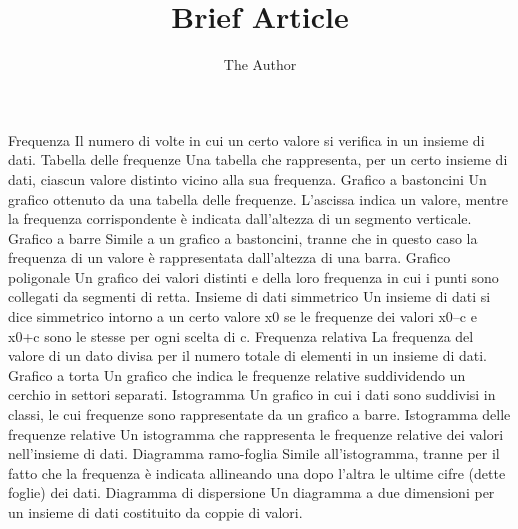\documentclass[11pt, oneside]{article}   	%
\title{Brief Article}
\author{The Author}
\begin{document}
\maketitle

Frequenza Il numero di volte in cui un certo valore si verifica in un insieme di dati.
Tabella delle frequenze Una tabella che rappresenta, per un certo insieme di dati,
ciascun valore distinto vicino alla sua frequenza.
Grafico a bastoncini Un grafico ottenuto da una tabella delle frequenze. L’ascissa
indica un valore, mentre la frequenza corrispondente è indicata dall’altezza di un segmento verticale.
Grafico a barre Simile a un grafico a bastoncini, tranne che in questo caso la frequenza di un valore è rappresentata dall’altezza di una barra.
Grafico poligonale Un grafico dei valori distinti e della loro frequenza in cui i punti
sono collegati da segmenti di retta.
Insieme di dati simmetrico Un insieme di dati si dice simmetrico intorno a un certo
valore x0 se le frequenze dei valori x0–c e x0+c sono le stesse per ogni scelta di c.
Frequenza relativa La frequenza del valore di un dato divisa per il numero totale di
elementi in un insieme di dati.
Grafico a torta Un grafico che indica le frequenze relative suddividendo un cerchio
in settori separati.
Istogramma Un grafico in cui i dati sono suddivisi in classi, le cui frequenze sono
rappresentate da un grafico a barre.
Istogramma delle frequenze relative Un istogramma che rappresenta le frequenze
relative dei valori nell’insieme di dati.
Diagramma ramo-foglia Simile all’istogramma, tranne per il fatto che la frequenza è
indicata allineando una dopo l’altra le ultime cifre (dette foglie) dei dati.
Diagramma di dispersione Un diagramma a due dimensioni per un insieme di dati
costituito da coppie di valori.
\end{document}
